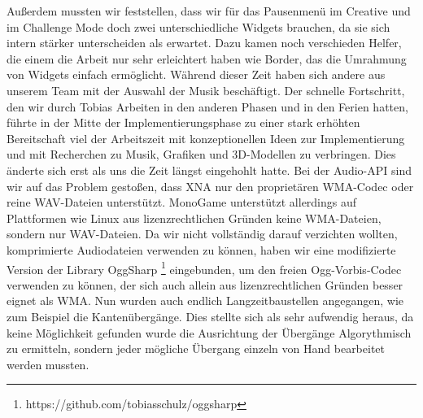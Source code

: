 Außerdem mussten wir feststellen, dass wir für das Pausenmenü im Creative und im Challenge Mode doch zwei unterschiedliche Widgets brauchen, da sie sich intern stärker unterscheiden als erwartet. Dazu kamen noch verschieden Helfer, die einem die Arbeit nur sehr erleichtert haben wie Border, das die Umrahmung von Widgets einfach ermöglicht.
Während dieser Zeit haben sich andere aus unserem Team mit der Auswahl der Musik beschäftigt.
Der schnelle Fortschritt, den wir durch Tobias Arbeiten in den anderen Phasen und in den Ferien hatten, führte in der Mitte der Implementierungsphase zu einer stark erhöhten Bereitschaft viel der Arbeitszeit mit konzeptionellen Ideen zur Implementierung und mit Recherchen zu Musik, Grafiken und 3D-Modellen zu verbringen.
Dies änderte sich erst als uns die Zeit längst eingehohlt hatte.
Bei der Audio-API sind wir auf das Problem gestoßen, dass XNA nur den proprietären WMA-Codec oder reine WAV-Dateien unterstützt. MonoGame unterstützt allerdings auf Plattformen wie Linux aus lizenzrechtlichen Gründen keine WMA-Dateien, sondern nur WAV-Dateien. Da wir nicht vollständig darauf verzichten wollten, komprimierte Audiodateien verwenden zu können, haben wir eine modifizierte Version der Library OggSharp \footnote{https://github.com/tobiasschulz/oggsharp} eingebunden, um den freien Ogg-Vorbis-Codec verwenden zu können, der sich auch allein aus lizenzrechtlichen Gründen besser eignet als WMA.
Nun wurden auch endlich Langzeitbaustellen angegangen, wie zum Beispiel die Kantenübergänge.
Dies stellte sich als sehr aufwendig heraus, da keine Möglichkeit gefunden wurde die Ausrichtung der Übergänge Algorythmisch zu ermitteln, sondern jeder mögliche Übergang einzeln von Hand bearbeitet werden mussten.

